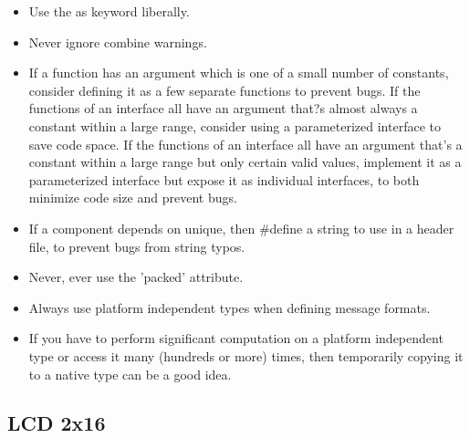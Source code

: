 \begin{itemize}
 \item Use the as keyword liberally.
 \item Never ignore combine warnings.
 \item If a function has an argument which is one of a small number of constants, consider
defining it as a few separate functions to prevent bugs. If the functions of an interface all have an argument
that?s almost always a constant within a large range, consider using a parameterized interface to save code
space. If the functions of an interface all have an argument that's a constant within a large range but only
certain valid values, implement it as a parameterized interface but expose it as individual interfaces, to both
minimize code size and prevent bugs.
 \item If a component depends on unique, then \#define a string to use in a header file, to
prevent bugs from string typos.
 \item Never, ever use the 'packed' attribute.
 \item Always use platform independent types when defining message formats.
 \item If you have to perform significant computation on a platform independent type or
access it many (hundreds or more) times, then temporarily copying it to a native type can be a good idea.


\end{itemize}


\subsection{LCD 2x16}



